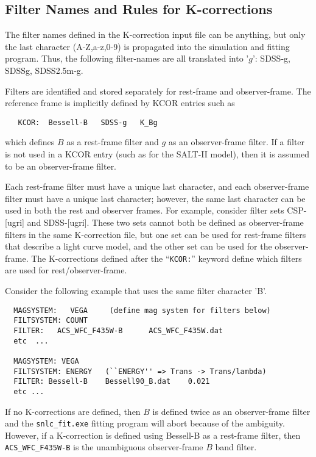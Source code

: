 \documentclass[12pt]{article}
\begin{document}
\subsection{Filter Names and Rules for K-corrections}
\label{subsec:filternames}
       	
The filter names defined in the K-correction input file
can be anything, but only the last character (A-Z,a-z,0-9) 
is propagated into the simulation and fitting program.
Thus, the following filter-names are all translated into '$g$':
SDSS-g, SDSSg, SDSS2.5m-g. 

Filters are identified and stored separately for rest-frame 
and observer-frame.
The reference frame is implicitly defined by KCOR entries
such as
\begin{verbatim}
   KCOR:  Bessell-B   SDSS-g   K_Bg 
\end{verbatim}
which defines $B$ as a rest-frame filter and $g$ as an 
observer-frame filter. If a filter is not used in a 
KCOR entry (such as for the SALT-II model), 
then it is assumed to be an observer-frame filter. 

Each rest-frame filter must have a unique last character, 
and each observer-frame filter must have a unique last character; 
however, the same last character can be used in both the rest 
and observer frames. For example, consider filter sets CSP-[ugri]
and SDSS-[ugri]. These two sets cannot both be defined as 
observer-frame filters in the same K-correction file, 
but one set can be used for rest-frame filters that describe a 
light curve model, and the other set can be used for the 
observer-frame. The K-corrections defined after the 
``{\tt KCOR:}'' keyword define which filters
are used for rest/observer-frame.


Consider the following example that uses the same filter character 'B'.
\begin{verbatim}
  MAGSYSTEM:   VEGA     (define mag system for filters below)
  FILTSYSTEM: COUNT
  FILTER:   ACS_WFC_F435W-B      ACS_WFC_F435W.dat
  etc  ...

  MAGSYSTEM: VEGA
  FILTSYSTEM: ENERGY   (``ENERGY'' => Trans -> Trans/lambda)
  FILTER: Bessell-B    Bessell90_B.dat    0.021
  etc ...
\end{verbatim}
%
If no K-corrections are defined, then $B$ is defined
twice as an observer-frame filter and the {\tt snlc\_fit.exe}
fitting program will abort because of the ambiguity.
However, if a K-correction is defined using Bessell-B
as a rest-frame filter, then {\tt ACS\_WFC\_F435W-B}
is the unambiguous observer-frame $B$ band filter.
\end{document}
